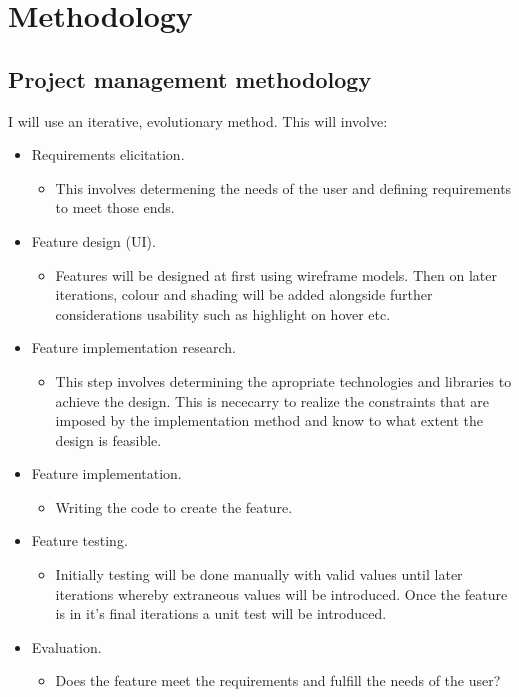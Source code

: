 \chapter{Methodology}
\label{methodology}

\section{Project management methodology}
I will use an iterative, evolutionary method. This will involve:
\begin{itemize}
  \item Requirements elicitation.
  \begin{itemize}
    \item This involves determening the needs of the user and defining requirements to meet those ends.
  \end{itemize}
  \item Feature design (UI).
  \begin{itemize}
    \item Features will be designed at first using wireframe models. Then on later iterations, colour and shading will be added alongside further considerations usability such as highlight on hover etc.
  \end{itemize}
  \item Feature implementation research.
  \begin{itemize}
    \item This step involves determining the apropriate technologies and libraries to achieve the design. This is nececarry to realize the constraints that are imposed by the implementation method and know to what extent the design is feasible.
  \end{itemize}
  \item Feature implementation.
  \begin{itemize}
    \item Writing the code to create the feature.
  \end{itemize}
  \item Feature testing.
  \begin{itemize}
    \item Initially testing will be done manually with valid values until later iterations whereby extraneous values will be introduced. Once the feature is in it's final iterations a unit test will be introduced.
  \end{itemize}
  \item Evaluation.
  \begin{itemize}
    \item Does the feature meet the requirements and fulfill the needs of the user?
  \end{itemize}
\end{itemize}
